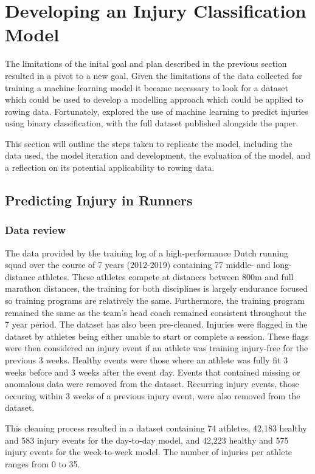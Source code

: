 \section{Developing an Injury Classification Model}
The limitations of the inital goal and plan described in the previous section resulted in a pivot to a new goal. Given the limitations of the data collected for training a machine learning model it became necessary to look for a dataset which could be used to develop a modelling approach which could be applied to rowing data. Fortunately, \textcite{Lovdal2021} explored the use of machine learning to predict injuries using binary classification, with the full dataset published alongside the paper. 

This section will outline the steps taken to replicate the model, including the data used, the model iteration and development, the evaluation of the model, and a reflection on its potential applicability to rowing data.

\subsection{Predicting Injury in Runners}
\subsubsection{Data review}
The data provided by \textcite{Lovdal2021} the training log of a high-performance Dutch running squad over the course of 7 years (2012-2019) containing 77 middle- and long-distance athletes. These athletes compete at distances between 800m and full marathon distances, the training for both disciplines is largely endurance focused so training programs are relatively the same. Furthermore, the training program remained the same as the team's head coach remained consistent throughout the 7 year period. The dataset has also been pre-cleaned. Injuries were flagged in the dataset by athletes being either unable to start or complete a session. These flags were then considered an injury event if an athlete was training injury-free for the previous 3 weeks. Healthy events were those where an athlete was fully fit 3 weeks before and 3 weeks after the event day. Events that contained missing or anomalous data were removed from the dataset. Recurring injury events, those occuring within 3 weeks of a previous injury event, were also removed from the dataset.

This cleaning process resulted in a dataset containing 74 athletes, 42,183 healthy and 583 injury events for the day-to-day model, and 42,223 healthy and 575 injury events for the week-to-week model. The number of injuries per athlete ranges from 0 to 35.

